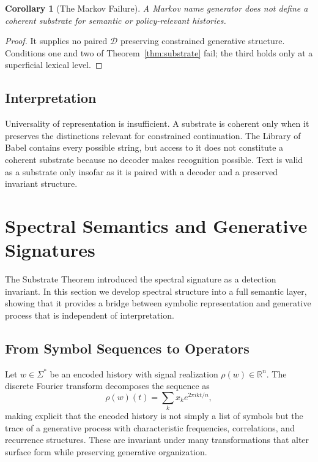 \documentclass[12pt, a4paper]{article}
\theoremstyle{plain}
\newtheorem{corollary}[theorem]{Corollary}
\theoremstyle{definition}
\theoremstyle{remark}
\begin{document}
\begin{corollary}[The Markov Failure]
A Markov name generator does not define a coherent substrate for semantic or policy-relevant histories.
\end{corollary}

\begin{proof}
It supplies no paired $\mathcal{D}$ preserving constrained generative structure. Conditions one and two of Theorem~\ref{thm:substrate} fail; the third holds only at a superficial lexical level.
\end{proof}

\subsection{Interpretation}

Universality of representation is insufficient. A substrate is coherent only when it preserves the distinctions relevant for constrained continuation. The Library of Babel contains every possible string, but access to it does not constitute a coherent substrate because no decoder makes recognition possible. Text is valid as a substrate only insofar as it is paired with a decoder and a preserved invariant structure.

\section{Spectral Semantics and Generative Signatures}

The Substrate Theorem introduced the spectral signature as a detection invariant. In this section we develop spectral structure into a full semantic layer, showing that it provides a bridge between symbolic representation and generative process that is independent of interpretation.

\subsection{From Symbol Sequences to Operators}

Let $w \in \Sigma^*$ be an encoded history with signal realization $\rho(w) \in \mathbb{R}^n$. The discrete Fourier transform decomposes the sequence as
\[
\rho(w)(t) = \sum_{k} \hat{x}_k e^{2\pi i k t / n},
\]
making explicit that the encoded history is not simply a list of symbols but the trace of a generative process with characteristic frequencies, correlations, and recurrence structures. These are invariant under many transformations that alter surface form while preserving generative organization.
\end{document}
